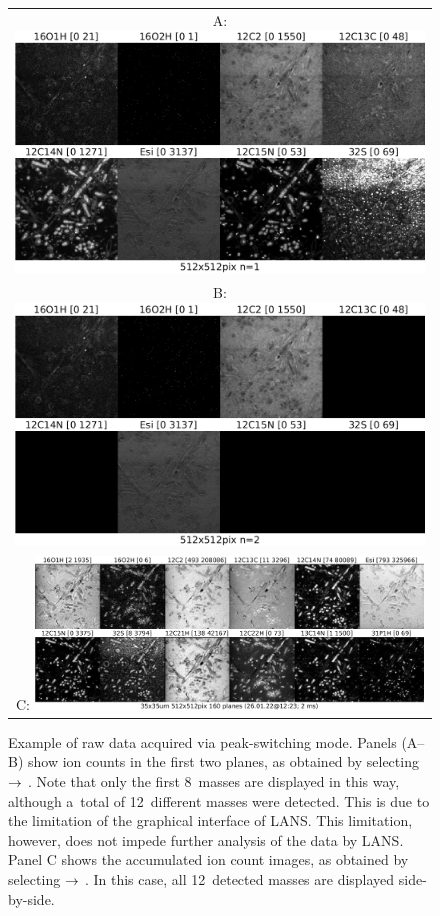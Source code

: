 \begin{figure}[!ht]
\centering
\begin{tabular}{c}
A: \includegraphics[scale=0.48, valign=t]{figs8/m-001}
\\
B: \includegraphics[scale=0.48, valign=t]{figs8/m-002}
\\
C: \includegraphics[width=0.95\textwidth, valign=t]{figs8/2022-01-25-OPG-all}
\end{tabular}
\caption{\label{fig:LANS-8plus-frames}%
Example of raw data acquired via peak-switching mode. Panels (A--B) show ion counts in the first two planes, as obtained by selecting  $\rightarrow$ . Note that only the first 8~masses are displayed in this way, although a~total of 12~different masses were detected. This is due to the limitation of the  graphical interface of LANS. This limitation, however, does not impede further analysis of the data by LANS. Panel C shows the accumulated ion count images, as obtained by selecting   $\rightarrow$ . In this case, all 12~detected masses are displayed side-by-side.}
\end{figure}

